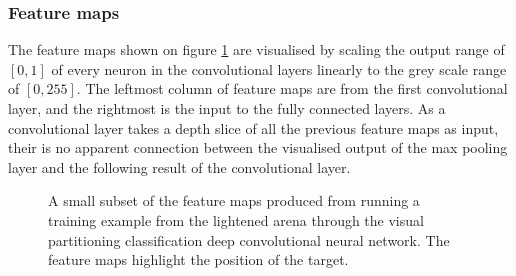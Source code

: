 
%
%


\subsubsection{Feature maps}
The feature maps shown on figure \ref{fig:featuremaps} are visualised by scaling the output range of $[0,1]$ of every neuron in the convolutional layers linearly to the grey scale range of $[0,255]$. The leftmost column of feature maps are from the first convolutional layer, and the rightmost is the input to the fully connected layers. As a convolutional layer takes a depth slice of all the previous feature maps as input, their is no apparent connection between the visualised output of the max pooling layer and the following result of the convolutional layer.

\begin{figure}[H]
	\begin{scriptsize}
		\sffamily
		\def\svgwidth{\textwidth}
		
	\end{scriptsize}
	\caption[Feature maps]{A small subset of the feature maps produced from running a training example from the lightened arena through the visual partitioning classification deep convolutional neural network. The feature maps highlight the position of the target.}
	\label{fig:featuremaps}
\end{figure}































































